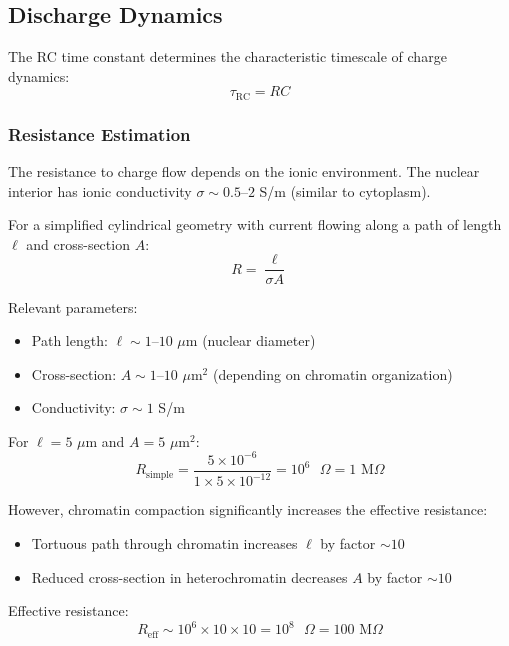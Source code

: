 \documentclass[twocolumn,10pt]{article}
\theoremstyle{remark}
\begin{document}
\subsection{Discharge Dynamics}

The RC time constant determines the characteristic timescale of charge dynamics:
\begin{equation}
\tau_{\mathrm{RC}} = RC
\end{equation}

\subsubsection{Resistance Estimation}

The resistance to charge flow depends on the ionic environment. The nuclear interior has ionic conductivity $\sigma \sim 0.5$--$2$ S/m (similar to cytoplasm).

For a simplified cylindrical geometry with current flowing along a path of length $\ell$ and cross-section $A$:
\begin{equation}
R = \frac{\ell}{\sigma A}
\end{equation}

Relevant parameters:
\begin{itemize}
\item Path length: $\ell \sim 1$--$10$ $\mu$m (nuclear diameter)
\item Cross-section: $A \sim 1$--$10$ $\mu$m$^2$ (depending on chromatin organization)
\item Conductivity: $\sigma \sim 1$ S/m
\end{itemize}

For $\ell = 5$ $\mu$m and $A = 5$ $\mu$m$^2$:
\begin{equation}
R_{\mathrm{simple}} = \frac{5 \times 10^{-6}}{1 \times 5 \times 10^{-12}} = 10^{6} \text{ }\Omega = 1 \text{ M}\Omega
\end{equation}

However, chromatin compaction significantly increases the effective resistance:
\begin{itemize}
\item Tortuous path through chromatin increases $\ell$ by factor $\sim 10$
\item Reduced cross-section in heterochromatin decreases $A$ by factor $\sim 10$
\end{itemize}

Effective resistance:
\begin{equation}
R_{\mathrm{eff}} \sim 10^6 \times 10 \times 10 = 10^8 \text{ }\Omega = 100 \text{ M}\Omega
\end{equation}
\end{document}
